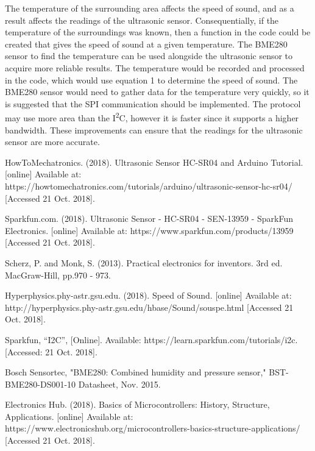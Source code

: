 \documentclass[11pt]{article}
\begin{document}
The temperature of the surrounding area affects the speed of sound, and as a result affects the readings of the ultrasonic sensor. Consequentially, if the temperature of the surroundings was known, then a function in the code could be created that gives the speed of sound at a given temperature. The BME280 sensor to find the temperature can be used alongside the ultrasonic sensor to acquire more reliable results. The temperature would be recorded and processed in the code, which would use equation 1 to determine the speed of sound. The BME280 sensor would need to gather data for the temperature very quickly, so it is suggested that the SPI communication should be implemented. The protocol may use more area than the I\textsuperscript{2}C, however it is faster since it supports a higher bandwidth. These improvements can ensure that the readings for the ultrasonic sensor are more accurate.\\ 

\pagebreak
\begin{thebibliography}{9}

HowToMechatronics. (2018). Ultrasonic Sensor HC-SR04 and Arduino Tutorial. [online] Available at: https://howtomechatronics.com/tutorials/arduino/ultrasonic-sensor-hc-sr04/ [Accessed 21 Oct. 2018].

Sparkfun.com. (2018). Ultrasonic Sensor - HC-SR04 - SEN-13959 - SparkFun Electronics. [online] Available at: https://www.sparkfun.com/products/13959 [Accessed 21 Oct. 2018].

Scherz, P. and Monk, S. (2013). Practical electronics for inventors. 3rd ed. MacGraw-Hill, pp.970 - 973.

Hyperphysics.phy-astr.gsu.edu. (2018). Speed of Sound. [online] Available at: http://hyperphysics.phy-astr.gsu.edu/hbase/Sound/souspe.html [Accessed 21 Oct. 2018].

Sparkfun, “I2C”, [Online]. Available: https://learn.sparkfun.com/tutorials/i2c. [Accessed: 21 Oct. 2018].

Bosch Sensortec, "BME280: Combined humidity and pressure sensor," BST-BME280-DS001-10 Datasheet, Nov. 2015. 

Electronics Hub. (2018). Basics of Microcontrollers: History, Structure, Applications. [online] Available at: https://www.electronicshub.org/microcontrollers-basics-structure-applications/ [Accessed 21 Oct. 2018].

\end{thebibliography}
\end{document}
